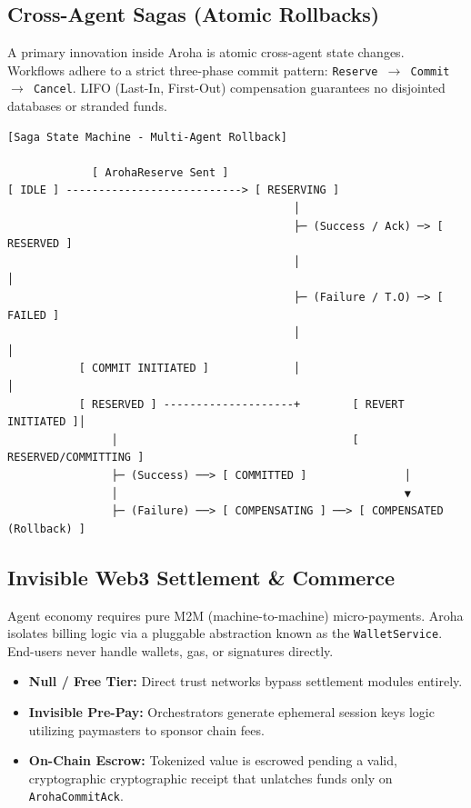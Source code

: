 \documentclass[11pt,a4paper]{article}
\begin{document}
\subsection{Cross-Agent Sagas (Atomic Rollbacks)}
A primary innovation inside Aroha is atomic cross-agent state changes. Workflows adhere to a strict three-phase commit pattern: \texttt{Reserve $\rightarrow$ Commit $\rightarrow$ Cancel}. LIFO (Last-In, First-Out) compensation guarantees no disjointed databases or stranded funds.

\begin{verbatim}
[Saga State Machine - Multi-Agent Rollback]

             [ ArohaReserve Sent ]
[ IDLE ] ---------------------------> [ RESERVING ]
                                            │
                                            ├─ (Success / Ack) ─> [ RESERVED ]
                                            │                            │
                                            ├─ (Failure / T.O) ─> [ FAILED ]
                                            │                            │
           [ COMMIT INITIATED ]             │                            │
           [ RESERVED ] --------------------+        [ REVERT INITIATED ]│
                │                                    [ RESERVED/COMMITTING ]
                ├─ (Success) ──> [ COMMITTED ]               │
                │                                            ▼
                ├─ (Failure) ──> [ COMPENSATING ] ──> [ COMPENSATED (Rollback) ]
\end{verbatim}

\subsection{Invisible Web3 Settlement \& Commerce}
Agent economy requires pure M2M (machine-to-machine) micro-payments. Aroha isolates billing logic via a pluggable abstraction known as the \texttt{WalletService}. End-users never handle wallets, gas, or signatures directly.

\begin{itemize}
    \item \textbf{Null / Free Tier:} Direct trust networks bypass settlement modules entirely.
    \item \textbf{Invisible Pre-Pay:} Orchestrators generate ephemeral session keys logic utilizing paymasters to sponsor chain fees. 
    \item \textbf{On-Chain Escrow:} Tokenized value is escrowed pending a valid, cryptographic cryptographic receipt that unlatches funds only on \texttt{ArohaCommitAck}.
\end{itemize}
\end{document}
